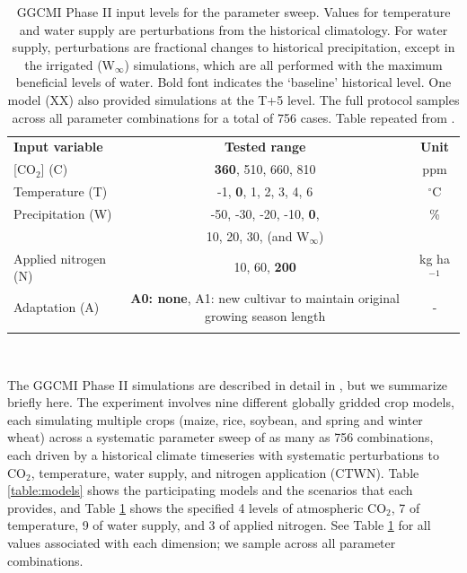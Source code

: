\documentclass[gmd, manuscript]{copernicus} %
\begin{document}
\begin{table}[ht]
    \caption{
    GGCMI Phase II input levels for the parameter sweep. 
    Values for temperature and water supply are perturbations from the historical climatology. 
    For water supply, perturbations are fractional changes to historical precipitation, except in the irrigated (W$_{\infty}$) simulations, which are all performed with the maximum beneficial levels of water. 
    Bold font indicates the `baseline' historical level. 
	One model (XX) also provided simulations at the T+5 level. 
    The full protocol samples across all parameter combinations for a total of 756 cases.
    Table repeated from \citet{franke2019ctwnexperiment}.
    }
    \label{table:inputs} 
    \begin{tabular}{lcc} 
        \tophline \vspace{1mm}
        \textbf{Input variable} & \textbf{Tested range} & \textbf{Unit} \\ \middlehline \vspace{1mm}
        [CO$_2$] (C) & \textbf{360}, 510, 660, 810 & ppm\\ \middlehline \vspace{1mm}
        Temperature (T) & -1, \textbf{0}, 1, 2, 3, 4, 6 & $^{\circ}$C\\ \middlehline \vspace{1mm}
        Precipitation (W) & -50, -30, -20, -10, \textbf{0}, & \% \\
        {} & 10, 20, 30, (and W$_{\infty}$) & {} \\ \middlehline \vspace{1mm}
        Applied nitrogen (N) & 10, 60, \textbf{200} & kg ha$^{-1}$ \\ \middlehline \vspace{1mm}
        Adaptation (A) & \textbf{A0: none}, A1: new cultivar to maintain original growing season length & -\\ \bottomhline
    \end{tabular}\\
\end{table}

The GGCMI Phase II simulations are described in detail in \citet{franke2019ctwnexperiment}, but we summarize briefly here. 
The experiment involves nine different globally gridded crop models, each simulating multiple crops (maize, rice, soybean, and spring and winter wheat) across a systematic parameter sweep of as many as 756 combinations, each driven by a historical climate timeseries with systematic perturbations to CO$_2$, temperature, water supply, and nitrogen application (CTWN). 
Table \ref{table:models} shows the participating models and the scenarios that each provides, and Table \ref{table:inputs} shows the specified 4 levels of atmospheric CO$_2$, 7 of temperature, 9 of water supply, and 3 of applied nitrogen. 
See Table \ref{table:inputs} for all values associated with each dimension; we sample across all parameter combinations.
\end{document}
